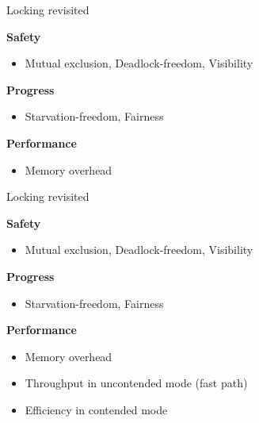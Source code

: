 \begin{frame}[t,noframenumbering]{Locking revisited}

\textbf{Safety}
\begin{itemize}
  \item Mutual exclusion, Deadlock-freedom, Visibility
\end{itemize}

\textbf{Progress}
\begin{itemize}
  \item Starvation-freedom, Fairness  
\end{itemize}

\textbf{Performance}
\begin{itemize}
  \item Memory overhead 
\end{itemize}


\end{frame}

\begin{frame}[t,noframenumbering]{Locking revisited}

\textbf{Safety}
\begin{itemize}
  \item Mutual exclusion, Deadlock-freedom, Visibility
\end{itemize}

\textbf{Progress}
\begin{itemize}
  \item Starvation-freedom, Fairness  
\end{itemize}

\textbf{Performance}
\begin{itemize}
  \item Memory overhead   
  \item Throughput in uncontended mode (fast path)
  \pause
  \item Efficiency in contended mode     
\end{itemize}
\end{frame}

